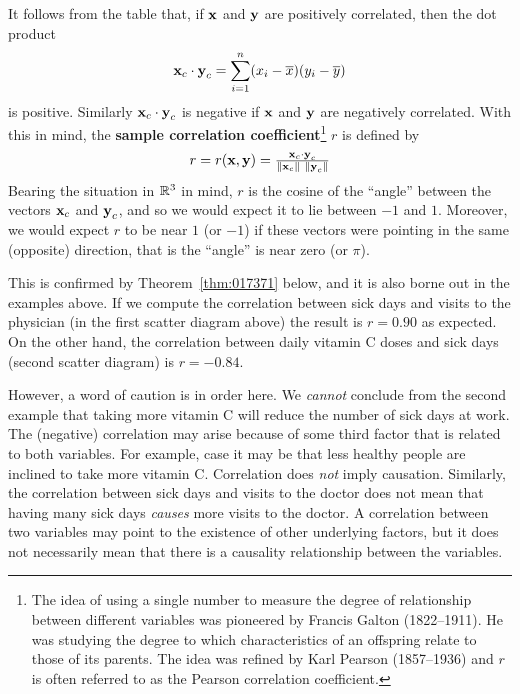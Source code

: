 It follows from the table that, if $\textbf{x}$ and $\textbf{y}$ are positively correlated, then the dot product
\begin{equation*}
\textbf{x}_c \cdot \textbf{y}_c = \sum_{i = 1}^{n}(x_i - \overline{x})(y_i - \overline{y})
\end{equation*}
is positive. Similarly $\textbf{x}_{c} \cdot \textbf{y}_{c}$ is negative if $\textbf{x}$ and $\textbf{y}$ are negatively correlated. With this in mind, the \textbf{sample correlation coefficient}\footnote{The idea of using a single number to measure the degree of relationship between different variables was pioneered by Francis Galton (1822--1911). He was studying the degree to which characteristics of an offspring relate to those of its parents. The idea was refined by Karl Pearson (1857--1936) and $r$ is often referred to as the Pearson correlation coefficient.} $r$ is defined by
\begin{equation*}
r = r(\textbf{x}, \textbf{y}) = \tfrac{\textbf{x}_c \cdot \textbf{y}_c}{\| \textbf{x}_c \|\ \| \textbf{y}_c \|}
\end{equation*}
Bearing the situation in $\mathbb{R}^3$ in mind, $r$ is the cosine of the ``angle'' between the vectors $\textbf{x}_{c}$ and $\textbf{y}_{c}$, and so we would expect it to lie between $-1$ and $1$. Moreover, we would expect $r$ to be near $1$ (or $-1$) if these vectors were pointing in the same (opposite) direction, that is the ``angle'' is near zero (or $\pi$).

This is confirmed by Theorem~\ref{thm:017371} below, and it is also borne out in the examples above. If we compute the correlation between sick days and visits to the physician (in the first scatter diagram above) the result is $r = 0.90$ as expected. On the other hand, the correlation between daily vitamin C doses and sick days (second scatter diagram) is $r = -0.84$.

However, a word of caution is in order here. We \textit{cannot} conclude from the second example that taking more vitamin C will reduce the number of sick days at work. The (negative) correlation may arise because of some third factor that is related to both variables. For  example, case it may be that less healthy people are inclined to take more vitamin C. Correlation does \textit{not} imply causation. Similarly, the correlation between sick days and visits to the doctor does not mean that having many sick days \textit{causes} more visits to the doctor. A  correlation between two variables may point to the existence of other underlying factors, but it does not necessarily mean that there is a causality relationship between the variables.

